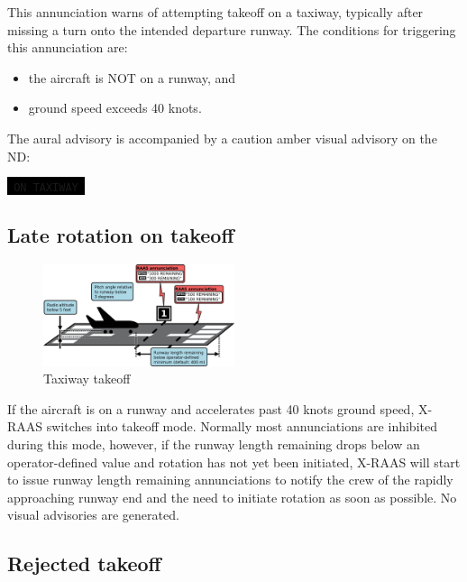 \documentclass[a4paper,12pt]{article}
\newcommand{\visualadvisory}[3][b]{%
    \ifthenelse{\equal{#1}{b}}{\begin{center}}{}
    \noindent
    \colorbox{black}{\textcolor{#2visualadvisorycolor}{\large\texttt{~#3~}}}
    \ifthenelse{\equal{#1}{b}}{\end{center}}{}}
\begin{document}
This annunciation warns of attempting takeoff on a taxiway, typically
after missing a turn onto the intended departure runway. The conditions
for triggering this annunciation are:

\begin{itemize}

\item the aircraft is NOT on a runway, and

\item ground speed exceeds 40 knots.

\end{itemize}

\noindent The aural advisory is accompanied by a caution amber visual
advisory on the ND:

\visualadvisory{nonroutine}{ON TAXIWAY}

\newpage
\subsection{Late rotation on takeoff}
\label{subsec:LateRotationMon}

\begin{figure}
\begin{center}
\includegraphics[width=0.5\textwidth]{../src/takeoff_roll.pdf}
\end{center}
\caption{Taxiway takeoff}
\end{figure}

If the aircraft is on a runway and accelerates past 40 knots ground
speed, X-RAAS switches into takeoff mode. Normally most annunciations are
inhibited during this mode, however, if the runway length remaining drops
below an operator-defined value and rotation has not yet been initiated,
X-RAAS will start to issue runway length remaining annunciations to
notify the crew of the rapidly approaching runway end and the need to
initiate rotation as soon as possible. No visual advisories are
generated.

\subsection{Rejected takeoff}
\label{subsec:RejectedTakeoffMon}
\end{document}
